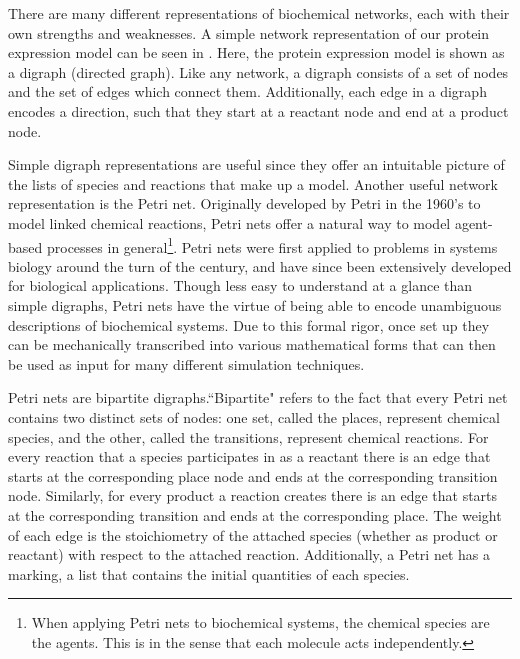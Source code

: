 There are many different representations of biochemical networks, each with their own strengths and weaknesses. A simple network representation of our protein expression model can be seen in . Here, the protein expression model is shown as a digraph (directed graph). Like any network, a digraph consists of a set of nodes and the set of edges which connect them. Additionally, each edge in a digraph encodes a direction, such that they start at a reactant node and end at a product node.

Simple digraph representations are useful since they offer an intuitable picture of the lists of species and reactions that make up a model. Another useful network representation is the Petri net. Originally developed by Petri in the 1960's\supercite{Petri:1966vs} to model linked chemical reactions, Petri nets offer a natural way to model agent-based processes in general\footnote{When applying Petri nets to biochemical systems, the chemical species are the agents. This is in the sense that each molecule acts independently.}. Petri nets were first applied to problems in systems biology around the turn of the century\supercite{Goss:1998tf}, and have since been extensively developed for biological applications\supercite{Pinney:2003tz,Hardy:2004tq,Haas:2006ts}. Though less easy to understand at a glance than simple digraphs, Petri nets have the virtue of being able to encode unambiguous descriptions of biochemical systems. Due to this formal rigor, once set up they can be mechanically transcribed into various mathematical forms that can then be used as input for many different simulation techniques.

Petri nets are bipartite digraphs.``Bipartite" refers to the fact that every Petri net contains two distinct sets of nodes: one set, called the places, represent chemical species, and the other, called the transitions, represent chemical reactions. For every reaction that a species participates in as a reactant there is an edge that starts at the corresponding place node and ends at the corresponding transition node. Similarly, for every product a reaction creates there is an edge that starts at the corresponding transition and ends at the corresponding place. The weight of each edge is the stoichiometry of the attached species (whether as product or reactant) with respect to the attached reaction. Additionally, a Petri net has a marking, a list that contains the initial quantities of each species.

